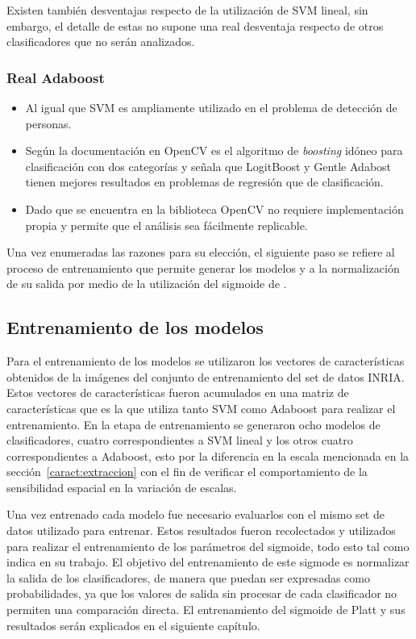 Existen también desventajas respecto de la utilización de SVM lineal, sin embargo, el detalle de estas no supone una real desventaja respecto de otros clasificadores que no serán analizados.

\subsubsection{ Real Adaboost}

\begin{itemize}
\item Al igual que SVM es ampliamente utilizado en el problema de detección de personas.
\item Según la documentación en OpenCV es el algoritmo de \textit{boosting} idóneo para clasificación con dos categorías y señala que LogitBoost y Gentle Adabost tienen mejores resultados en problemas de regresión que de clasificación.
\item Dado que se encuentra en la biblioteca OpenCV no requiere implementación propia y permite que el análisis sea fácilmente replicable.
\end{itemize}

Una vez enumeradas las razones para su elección, el siguiente paso se refiere al proceso de entrenamiento que permite generar los modelos y a la normalización de su salida por medio de la utilización del sigmoide de \cite{Platt1999}.

\subsection{Entrenamiento de los modelos}

Para el entrenamiento de los modelos se utilizaron los vectores de características obtenidos de la imágenes del conjunto de entrenamiento del set de datos INRIA. Estos vectores de características fueron acumulados en una matriz de características que es la que utiliza tanto SVM como Adaboost para realizar el entrenamiento. En la etapa de entrenamiento se generaron ocho modelos de clasificadores, cuatro correspondientes a SVM lineal y los otros cuatro correspondientes a Adaboost, esto por la diferencia en la escala mencionada en la sección~\ref{caract:extraccion} con el fin de verificar el comportamiento de la sensibilidad espacial en la variación de escalas.

Una vez entrenado cada modelo fue necesario evaluarlos con el mismo set de datos utilizado para entrenar. Estos resultados fueron recolectados y utilizados para realizar el entrenamiento de los parámetros del sigmoide, todo esto tal como indica \cite{Platt1999} en su trabajo.  El objetivo del entrenamiento de este sigmode es normalizar la salida de los clasificadores, de manera que puedan ser expresadas como probabilidades, ya que los valores de salida sin procesar de cada clasificador no permiten una comparación directa. El entrenamiento del sigmoide de Platt y sus resultados serán explicados en el siguiente capítulo.

